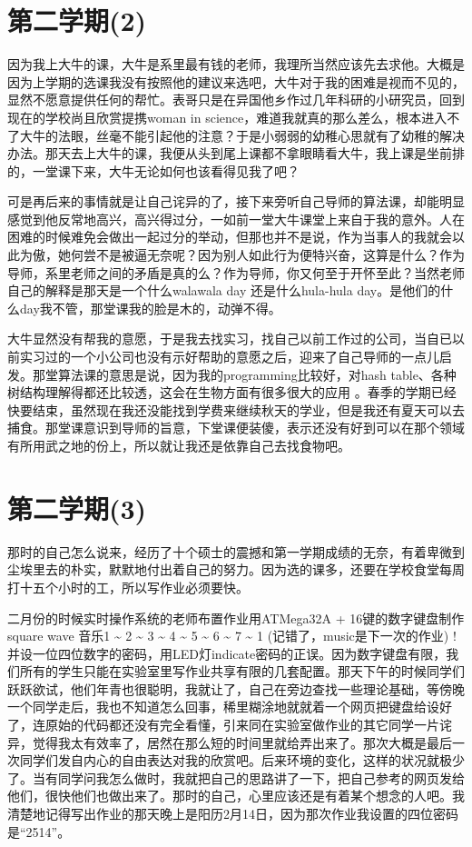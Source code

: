 \documentclass[12pt]{book}
\begin{document}
\section{第二学期(2)}
\label{sec-4-2}

因为我上大牛的课，大牛是系里最有钱的老师，我理所当然应该先去求他。大概是因为上学期的选课我没有按照他的建议来选吧，大牛对于我的困难是视而不见的，显然不愿意提供任何的帮忙。表哥只是在异国他乡作过几年科研的小研究员，回到现在的学校尚且欣赏提携woman in science，难道我就真的那么差么，根本进入不了大牛的法眼，丝毫不能引起他的注意？于是小弱弱的幼稚心思就有了幼稚的解决办法。那天去上大牛的课，我便从头到尾上课都不拿眼睛看大牛，我上课是坐前排的，一堂课下来，大牛无论如何也该看得见我了吧？

可是再后来的事情就是让自己诧异的了，接下来旁听自己导师的算法课，却能明显感觉到他反常地高兴，高兴得过分，一如前一堂大牛课堂上来自于我的意外。人在困难的时候难免会做出一起过分的举动，但那也并不是说，作为当事人的我就会以此为傲，她何尝不是被逼无奈呢？因为别人如此行为便特兴奋，这算是什么？作为导师，系里老师之间的矛盾是真的么？作为导师，你又何至于开怀至此？当然老师自己的解释是那天是一个什么walawala day 还是什么hula-hula day。是他们的什么day我不管，那堂课我的脸是木的，动弹不得。

大牛显然没有帮我的意愿，于是我去找实习，找自己以前工作过的公司，当自已以前实习过的一个小公司也没有示好帮助的意愿之后，迎来了自己导师的一点儿启发。那堂算法课的意思是说，因为我的programming比较好，对hash table、各种树结构理解得都还比较透，这会在生物方面有很多很大的应用 。春季的学期已经快要结束，虽然现在我还没能找到学费来继续秋天的学业，但是我还有夏天可以去捕食。那堂课意识到导师的旨意，下堂课便装傻，表示还没有好到可以在那个领域有所用武之地的份上，所以就让我还是依靠自己去找食物吧。

\section{第二学期(3)}
\label{sec-4-3}
那时的自己怎么说来，经历了十个硕士的震撼和第一学期成绩的无奈，有着卑微到尘埃里去的朴实，默默地付出着自己的努力。因为选的课多，还要在学校食堂每周打十五个小时的工，所以写作业必须要快。

二月份的时候实时操作系统的老师布置作业用ATMega32A + 16键的数字键盘制作square wave 音乐1 \textasciitilde{} 2 \textasciitilde{} 3 \textasciitilde{} 4 \textasciitilde{} 5 \textasciitilde{} 6 \textasciitilde{} 7 \textasciitilde{} 1 (记错了，music是下一次的作业) ! 并设一位四位数字的密码，用LED灯indicate密码的正误。因为数字键盘有限，我们所有的学生只能在实验室里写作业共享有限的几套配置。那天下午的时候同学们跃跃欲试，他们年青也很聪明，我就让了，自己在旁边查找一些理论基础，等傍晚一个同学走后，我也不知道怎么回事，稀里糊涂地就就着一个网页把键盘给设好了，连原始的代码都还没有完全看懂，引来同在实验室做作业的其它同学一片诧异，觉得我太有效率了，居然在那么短的时间里就给弄出来了。那次大概是最后一次同学们发自内心的自由表达对我的欣赏吧。后来环境的变化，这样的状况就极少了。当有同学问我怎么做时，我就把自己的思路讲了一下，把自己参考的网页发给他们，很快他们也做出来了。那时的自己，心里应该还是有着某个想念的人吧。我清楚地记得写出作业的那天晚上是阳历2月14日，因为那次作业我设置的四位密码是“2514”。
\end{document}
